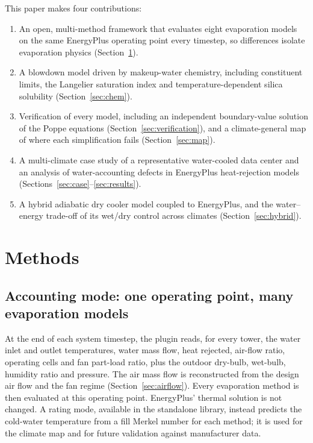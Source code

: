 \documentclass[preprint,12pt,authoryear]{elsarticle}
\begin{document}
This paper makes four contributions:
\begin{enumerate}
\item An open, multi-method framework that evaluates eight evaporation models on the same EnergyPlus operating point
every timestep, so differences isolate evaporation physics (Section~\ref{sec:methods}).
\item A blowdown model driven by makeup-water chemistry, including constituent limits, the Langelier saturation index
and temperature-dependent silica solubility (Section~\ref{sec:chem}).
\item Verification of every model, including an independent boundary-value solution of the Poppe equations
(Section~\ref{sec:verification}), and a climate-general map of where each simplification fails
(Section~\ref{sec:map}).
\item A multi-climate case study of a representative water-cooled data center and an analysis of
water-accounting defects in EnergyPlus heat-rejection models (Sections~\ref{sec:case}--\ref{sec:results}).
\item A hybrid adiabatic dry cooler model coupled to EnergyPlus, and the water--energy trade-off of its
wet/dry control across climates (Section~\ref{sec:hybrid}).
\end{enumerate}

\section{Methods}\label{sec:methods}
\subsection{Accounting mode: one operating point, many evaporation models}
At the end of each system timestep, the plugin reads, for every tower, the water inlet and outlet temperatures,
water mass flow, heat rejected, air-flow ratio, operating cells and fan part-load ratio, plus the outdoor dry-bulb,
wet-bulb, humidity ratio and pressure. The air mass flow is reconstructed from the design air flow and the fan regime
(Section~\ref{sec:airflow}). Every evaporation method is then evaluated at this operating point. EnergyPlus' thermal
solution is not changed. A rating mode, available in the standalone library, instead predicts the cold-water
temperature from a fill Merkel number for each method; it is used for the climate map and for future validation
against manufacturer data.
\end{document}
